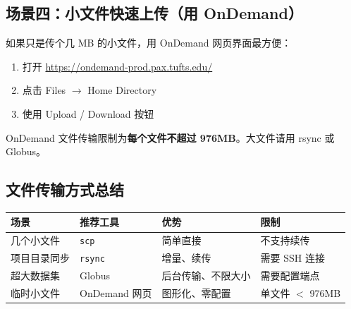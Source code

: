 \subsection{场景四：小文件快速上传（用 OnDemand）}

如果只是传个几 MB 的小文件，用 OnDemand 网页界面最方便：

\begin{enumerate}[nosep]
  \item 打开 \url{https://ondemand-prod.pax.tufts.edu/}
  \item 点击 Files $\rightarrow$ Home Directory
  \item 使用 Upload / Download 按钮
\end{enumerate}

\begin{warnbox}
OnDemand 文件传输限制为\textbf{每个文件不超过 976MB}。大文件请用 rsync 或 Globus。
\end{warnbox}

\subsection{文件传输方式总结}

\begin{table}[h]
\centering
\begin{tabular}{llll}
\toprule
场景 & 推荐工具 & 优势 & 限制 \\
\midrule
几个小文件 & \texttt{scp} & 简单直接 & 不支持续传 \\
项目目录同步 & \texttt{rsync} & 增量、续传 & 需要 SSH 连接 \\
超大数据集 & Globus & 后台传输、不限大小 & 需要配置端点 \\
临时小文件 & OnDemand 网页 & 图形化、零配置 & 单文件 $<$ 976MB \\
\bottomrule
\end{tabular}
\end{table}
